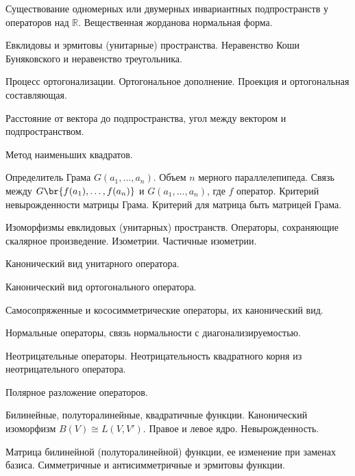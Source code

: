 \documentclass[a4paper]{article}
\begin{document}
\begin{nums}{-2}
\item Существование одномерных или двумерных инвариантных
подпространств у операторов над $\mathbb{R}$. Вещественная
жорданова нормальная форма.

\item Евклидовы   и эрмитовы    (унитарные) пространства.
Неравенство Коши Буняковского  и неравенство треугольника.

\item Процесс ортогонализации.     Ортогональное дополнение.
Проекция и ортогональная составляющая.

\item Расстояние от вектора до подпространства, угол между вектором
и подпространством.

\item Метод наименьших квадратов.

\item  Определитель Грама $G(a_1,\ldots, a_n)$. Объем $n$ мерного
параллелепипеда. Связь между $G\br{f(a_1),\ldots, f(a_n)}$ и
$G(a_1,\ldots, a_n)$, где $f$ оператор. Критерий
невырожденности матрицы Грама. Критерий для матрица быть матрицей
Грама.

\item  Изоморфизмы евклидовых   (унитарных) пространств. Операторы,
сохраняющие скалярное произведение. Изометрии. Частичные
изометрии.

\item Канонический вид унитарного оператора.

\item  Канонический вид ортогонального оператора.

\item Самосопряженные и кососимметрические операторы, их
канонический вид.

\item Нормальные операторы, связь нормальности с
диагонализируемостью.

\item Неотрицательные   операторы. Неотрицательность   квадратного
корня из   неотрицательного оператора.

\item  Полярное разложение операторов.

\item  Билинейные, полуторалинейные, квадратичные функции.
Канонический изоморфизм $B(V)\cong L(V, V')$. Правое и левое ядро.
Невырожденность.

\item Матрица   билинейной   (полуторалинейной)   функции,   ее
изменение   при   заменах   базиса. Симметричные и антисимметричные и
эрмитовы функции.


\end{nums}
\end{document}
